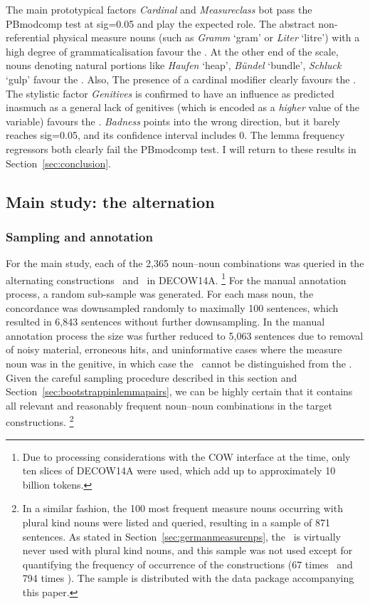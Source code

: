 The main prototypical factors \textit{Cardinal} and \textit{Measureclass} bot pass the PBmodcomp test at sig=0.05 and play the expected role.
The abstract non-referential physical measure nouns (such as \textit{Gramm} `gram' or \textit{Liter} `litre') with a high degree of grammaticalisation favour the \NACb.
At the other end of the scale, nouns denoting natural portions like \textit{Haufen} `heap', \textit{Bündel} `bundle', \textit{Schluck} `gulp' favour the \PGCd.
Also, The presence of a cardinal modifier clearly favours the \NACb.
The stylistic factor \textit{Genitives} is confirmed to have an influence as predicted inasmuch as a general lack of genitives (which is encoded as a \textit{higher} value of the variable) favours the \NACb.
\textit{Badness} points into the wrong direction, but it barely reaches sig=0.05, and its confidence interval includes 0.
The lemma frequency regressors both clearly fail the PBmodcomp test.
I will return to these results in Section~\ref{sec:conclusion}.

\subsection{Main study: the alternation}
\label{sec:annotation}
\label{sec:corpushierarchicalmodel}

\subsubsection{Sampling and annotation}

For the main study, each of the 2,365 noun–noun combinations was queried in the alternating constructions \PGCa\ and \NACa\ in DECOW14A.%
\footnote{Due to processing considerations with the COW interface at the time, only ten slices of DECOW14A were used, which add up to approximately 10 billion tokens.}
For the manual annotation process, a random sub-sample was generated.
For each mass noun, the concordance was downsampled randomly to maximally 100 sentences, which resulted in 6,843 sentences without further downsampling.
In the manual annotation process the size was further reduced to 5,063 sentences due to removal of noisy material, erroneous hits, and uninformative cases where the measure noun was in the genitive, in which case the \NACa\ cannot be distinguished from the \PGCa.
Given the careful sampling procedure described in this section and Section~\ref{sec:bootstrappinlemmapairs}, we can be highly certain that it contains all relevant and reasonably frequent noun–noun combinations in the target constructions.%
\footnote{In a similar fashion, the 100 most frequent measure nouns occurring with plural kind nouns were listed and queried, resulting in a sample of 871 sentences.
As stated in Section~\ref{sec:germanmeasurenps}, the \NACa\ is virtually never used with plural kind nouns, and this sample was not used except for quantifying the frequency of occurrence of the constructions (67 times \NACa\ and 794 times \PGCa).
The sample is distributed with the data package accompanying this paper.}


